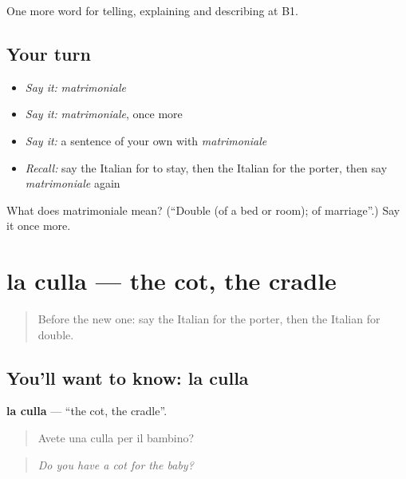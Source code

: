 \begin{grammarlens}[title={What you've built}]
One more word for telling, explaining and describing at B1.
\end{grammarlens}

\subsection*{Your turn}
\begin{itemize}
\raggedright
  \item \emph{Say it:} \emph{matrimoniale}
  \item \emph{Say it:} \emph{matrimoniale}, once more
  \item \emph{Say it:} a sentence of your own with \emph{matrimoniale}
  \item \emph{Recall:} say the Italian for to stay, then the Italian for the porter, then say \emph{matrimoniale} again
\end{itemize}

\begin{tcolorbox}[breakable,colback=teal!4,colframe=teal!35!black,title={Before you move on}]
What does matrimoniale mean? (\textquotedblleft{}Double (of a bed or room); of marriage\textquotedblright{}.) Say it once more.
\end{tcolorbox}
\section[la culla]{la culla — the cot, the cradle}

\label{lesson:IT-C433-culla}



\begin{quote}
Before the new one: say the Italian for the porter, then the Italian for double.
\end{quote}

\subsection*{You'll want to know: la culla}
\textbf{la culla} — \textquotedblleft{}the cot, the cradle\textquotedblright{}.

\begin{quote}
Avete una culla per il bambino?
\end{quote}

\begin{quote}
\emph{Do you have a cot for the baby?}
\end{quote}

